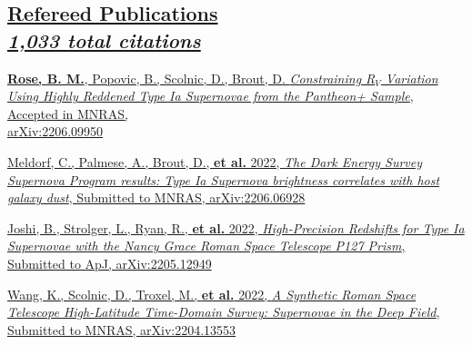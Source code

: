 \documentclass[margin]{res}
\begin{document}
\begin{resume}
\section{
\href{https://ui.adsabs.harvard.edu/search/filter_property_fq_property=AND&filter_property_fq_property=property\%3A\%22refereed\%22&fq=\%7B!type\%3Daqp\%20v\%3D\%24fq_property\%7D&fq_property=(property\%3A\%22refereed\%22)&p_=0&q=orcid\%3A0000-0002-1873-8973&sort=citation_count\%20desc\%2C\%20bibcode\%20desc}
{Refereed Publications\\  
\normalfont \textit{\small{\hspace{-0.3em}
1,033 total citations
}}}
}


\hangindent=15pt 
\href{https://ui.adsabs.harvard.edu/abs/2022arXiv220609950R/abstract}{{\bf Rose, B. M.}, Popovic, B., Scolnic, D., Brout, D. {\sl Constraining R$_V$ Variation Using Highly Reddened Type Ia Supernovae from the Pantheon+ Sample}, Accepted in MNRAS, \\arXiv:2206.09950}
\vspace{-12pt}

\hangindent=15pt 
\href{https://ui.adsabs.harvard.edu/abs/2022arXiv220606928M/abstract}{Meldorf, C., Palmese, A.,  Brout, D., \textbf{et al.} 2022, {\sl The Dark Energy Survey Supernova Program results: Type Ia Supernova brightness correlates with host galaxy dust}, Submitted to MNRAS, arXiv:2206.06928}
\vspace{-12pt}

\hangindent=15pt 
\href{https://ui.adsabs.harvard.edu/abs/2022arXiv220512949J/abstract}{Joshi, B., Strolger, L.,  Ryan, R., \textbf{et al.} 2022, {\sl High-Precision Redshifts for Type Ia Supernovae with the Nancy Grace Roman Space Telescope P127 Prism}, Submitted to ApJ, arXiv:2205.12949}
\vspace{-12pt}

\hangindent=15pt 
\href{https://ui.adsabs.harvard.edu/abs/2022arXiv220413553W/abstract}{Wang, K., Scolnic, D., Troxel, M., \textbf{et al.} 2022, {\sl A Synthetic Roman Space Telescope High-Latitude Time-Domain Survey: Supernovae in the Deep Field}, Submitted to MNRAS, arXiv:2204.13553}
\vspace{-12pt}


\end{resume}
\end{document}
